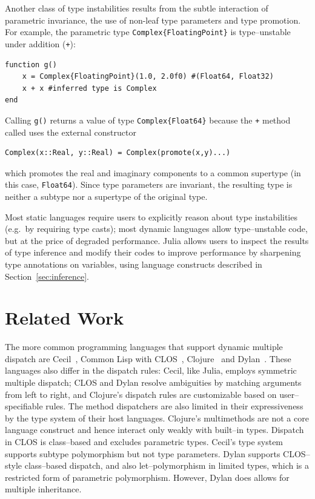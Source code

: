 \documentclass[pldi]{sigplanconf-pldi15}
\begin{document}
Another class of type instabilities results from the subtle interaction of
parametric invariance, the use of non-leaf type parameters and type promotion.
For example, the parametric type \verb|Complex{FloatingPoint}| is
type--unstable under addition (\verb|+|):

\begin{lstlisting}
function g()
    x = Complex{FloatingPoint}(1.0, 2.0f0) #(Float64, Float32)
    x + x #inferred type is Complex
end
\end{lstlisting}
%
Calling \verb|g()| returns a value of type \verb|Complex{Float64}| because the
\verb|+| method called uses the external constructor

\begin{lstlisting}
Complex(x::Real, y::Real) = Complex(promote(x,y)...)
\end{lstlisting}
%
which promotes the real and imaginary components to a common supertype (in this
case, \verb|Float64|). Since type parameters are invariant, the resulting type
is neither a subtype nor a supertype of the original type.

Most static languages require users to explicitly reason about type
instabilities (e.g.\ by requiring type casts); most dynamic languages allow
type--unstable code, but at the price of degraded performance. Julia allows
users to inspect the results of type inference and modify their codes to
improve performance by sharpening type annotations on variables, using language
constructs described in Section~\ref{sec:inference}.


\section{Related Work}

The more common programming languages that support dynamic multiple dispatch
are Cecil~\cite{Chambers1992,Chambers1994}, Common Lisp with
CLOS~\cite{Bobrow1988}, Clojure~\cite{Hickey2008} and Dylan~\cite{dylanman}.
These languages also differ in the dispatch rules: Cecil, like Julia, employs
symmetric multiple dispatch; CLOS and Dylan resolve ambiguities by matching
arguments from left to right, and Clojure's dispatch rules are
customizable based on user--specifiable rules. The method dispatchers are also
limited in their expressiveness by the type system of their host languages.
Clojure's multimethods are not a core language construct and hence interact
only weakly with built--in types. Dispatch in CLOS is class--based and excludes
parametric types. Cecil's type system supports subtype polymorphism but not
type parameters. Dylan supports CLOS--style class--based dispatch, and also
let--polymorphism in limited types, which is a restricted form of parametric
polymorphism. However, Dylan does allows for multiple inheritance.
\end{document}
